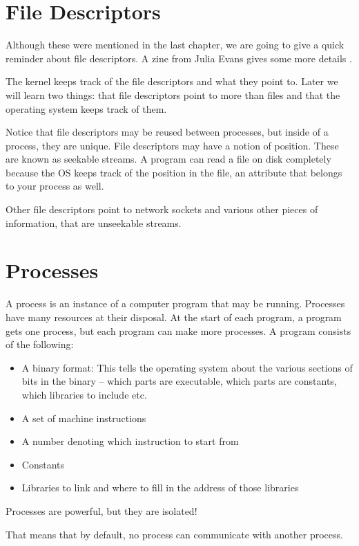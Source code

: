\section{File Descriptors}

Although these were mentioned in the last chapter, we are going to give a quick reminder about file descriptors.
A zine from Julia Evans gives some more details \cite{evans_2018}.

The kernel keeps track of the file descriptors and what they point to.
Later we will learn two things: that file descriptors point to more than files and that the operating system keeps track of them.

Notice that file descriptors may be reused between processes, but inside of a process, they are unique.
File descriptors may have a notion of position. These are known as seekable streams.
A program can read a file on disk completely because the OS keeps track of the position in the file, an attribute that belongs to your process as well.

Other file descriptors point to network sockets and various other pieces of information, that are unseekable streams.

\section{Processes}

A process is an instance of a computer program that may be running.
Processes have many resources at their disposal.
At the start of each program, a program gets one process, but each program can make more processes.
A program consists of the following:

\begin{itemize}
    \item A binary format: This tells the operating system about the various sections of bits in the binary -- which parts are executable, which parts are constants, which libraries to include etc.
    \item A set of machine instructions
    \item A number denoting which instruction to start from
    \item Constants
    \item Libraries to link and where to fill in the address of those libraries
\end{itemize}

Processes are powerful, but they are isolated!

That means that by default, no process can communicate with another process.

